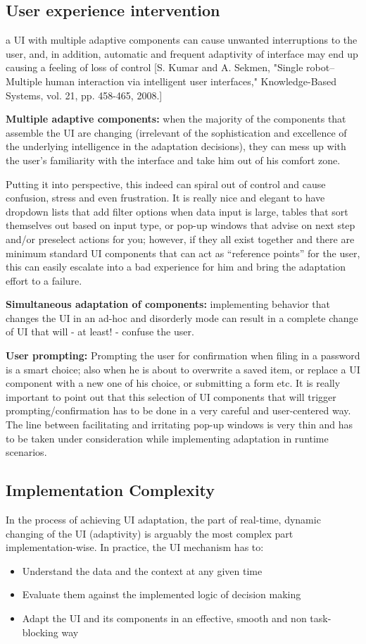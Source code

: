 \subsection{User experience intervention}
a UI with multiple adaptive components can cause unwanted interruptions to the user, and, in addition,
automatic and frequent adaptivity of interface may end up causing a feeling of loss of control [S. Kumar and A. Sekmen, "Single robot–Multiple human interaction via intelligent user interfaces," Knowledge-Based Systems, vol. 21, pp. 458-465, 2008.]

\textbf{Multiple adaptive components:} when the majority of the components that assemble the UI are
changing (irrelevant of the sophistication and excellence of the underlying intelligence in the adaptation decisions),
they can mess up with the user’s familiarity with the interface and take him out of his comfort zone.

Putting it into perspective, this indeed can spiral out of control and cause confusion,
stress and even frustration. It is really nice and elegant to have dropdown lists that add filter options when data input is large,
tables that sort themselves out based on input type, or pop-up windows that advise on next step and/or preselect actions for you; however,
if they all exist together and there are minimum standard UI components that can act as “reference points” for the user,
this can easily escalate into a bad experience for him and bring the adaptation effort to a failure.

\textbf{Simultaneous adaptation of components:} implementing behavior that changes the UI in an ad-hoc and disorderly mode can result
in a complete change of UI that will - at least! - confuse the user.

\textbf{User prompting:} Prompting the user for confirmation when filing in a password is a smart choice; also when he is about to overwrite a saved item,
or replace a UI component with a new one of his choice, or submitting a form etc. It is really important to point out that
this selection of UI components that will trigger prompting/confirmation has to be done in a very careful and user-centered way.
The line between facilitating and irritating pop-up windows is very thin and has to be taken under consideration while
implementing adaptation in runtime scenarios.

\subsection{Implementation Complexity}
In the process of achieving UI adaptation, the part of real-time, dynamic changing of the UI (adaptivity) is arguably the
most complex part implementation-wise. In practice, the UI mechanism has to:
\begin{itemize}
    \item Understand the data and the context at any given time
    \item Evaluate them against the implemented logic of decision making
    \item Adapt the UI and its components in an effective, smooth and non task-blocking way
\end{itemize}

